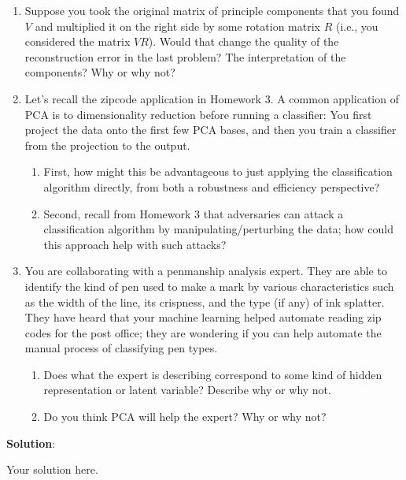 \documentclass[submit]{../harvardml}
\newenvironment{solution}{
    \vspace{2mm}
    \color{blue}\noindent\textbf{Solution}:
}{}
\begin{document}
\begin{problem}
\begin{enumerate}
    \item Suppose you took the original matrix of principle components
    that you found $V$ and multiplied it on the right side by some rotation matrix $R$ (i.e., you considered the matrix $VR$).
    Would that change the quality of the reconstruction error in the
    last problem?  The interpretation of the components?  Why or why
    not?

    \item Let's recall the zipcode application in Homework 3.  A common
    application of PCA is to dimensionality reduction before running a
    classifier: You first project the data onto the first few PCA bases,
    and then you train a classifier from the projection to the output.
    \begin{enumerate}
      \item First, how might this be advantageous to just applying the classification algorithm directly, from both a robustness and efficiency perspective? 
      
      \item Second, recall from Homework 3 that adversaries can attack a classification algorithm by manipulating/perturbing the data; how could this approach help with such attacks?
    \end{enumerate}

    \item You are collaborating with a penmanship analysis expert.  They
    are able to identify the kind of pen used to make a mark by various
    characteristics such as the width of the line, its crispness, and
    the type (if any) of ink splatter.  They have heard that your
    machine learning helped automate reading zip codes for the post
    office; they are wondering if you can help automate the manual
    process of classifying pen types.
    \begin{enumerate}

      \item Does what the expert is describing correspond to some kind
      of hidden representation or latent variable?  Describe why or
      why not.
      
      \item Do you think PCA will help the expert?  Why or why not?
    \end{enumerate}
  \end{enumerate}
\end{problem}

\newpage

\begin{solution}
	Your solution here.
\end{solution}
\end{document}
